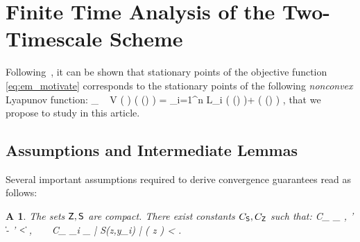 \documentclass[11pt]{article}
\makeatletter
\newtheorem{assumption}{A\!\!}
\theoremstyle{t}
\DeclareRobustCommand*\cal{\@fontswitch\relax\mathcal}
\makeatother
\begin{document}
\vspace{-0.05in}
\section{Finite Time Analysis of the Two-Timescale Scheme} \label{sec:mainanalysis}
\vspace{-0.05in}

Following~\citep{cappe2009line}, it can be shown that stationary points of the objective function \eqref{eq:em_motivate} corresponds to the stationary points of the following \textit{nonconvex} Lyapunov function:
\beq\label{eq:em_sspace}
\min_{ {\bss} \in \Sset }~  V ( {\bss} ) \eqdef \overline\calL( \op(\bss) ) =   \sum_{i=1}^n {\cal L}_i (  \op(\bss) )+ \Pen (  \op(\bss) ) \eqs,
\eeq
that we propose to study in this article.

\vspace{-0.05in}
\subsection{Assumptions and Intermediate Lemmas}
\vspace{-0.05in}


Several important assumptions required to derive convergence guarantees read as follows:
\begin{assumption}\label{ass:compact}
The sets $\Zset, \Sset$ are compact. There exist constants $C_{\Sset}, C_{\Zset}$ such that:
\beq \textstyle \label{eq:compact}
C_{\Sset} \eqdef \max_{ \bss, \bss' \in \Sset } \| \bss - \bss' \| < \infty,~~~~C_{\Zset} \eqdef \max_{i \in \inter} \int_{\Zset} | S(z,y_i) | \mu( \rmd z ) < \infty.
\eeq
\end{assumption}
\end{document}
